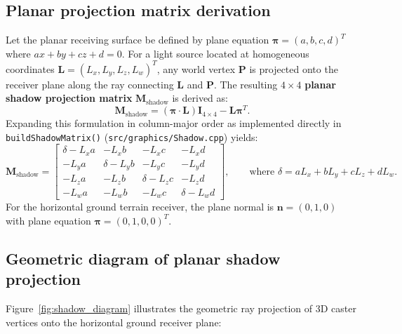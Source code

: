 \documentclass[10pt,a4paper,oneside]{article}
\begin{document}
\subsection{Planar projection matrix derivation}
Let the planar receiving surface be defined by plane equation $\boldsymbol\pi = (a, b, c, d)^T$ where $ax + by + cz + d = 0$. For a light source located at homogeneous coordinates $\mathbf{L} = (L_x, L_y, L_z, L_w)^T$, any world vertex $\mathbf{P}$ is projected onto the receiver plane along the ray connecting $\mathbf{L}$ and $\mathbf{P}$. The resulting $4 \times 4$ \textbf{planar shadow projection matrix} $\mathbf{M}_{\text{shadow}}$ is derived as:
\begin{equation}
\mathbf{M}_{\text{shadow}} = (\boldsymbol\pi \cdot \mathbf{L})\mathbf{I}_{4\times 4} - \mathbf{L} \boldsymbol\pi^T.
\end{equation}
Expanding this formulation in column-major order as implemented directly in \texttt{buildShadowMatrix()} (\texttt{src/graphics/Shadow.cpp}) yields:
\begin{equation}
\mathbf{M}_{\text{shadow}} = \begin{bmatrix}
\delta - L_x a & -L_x b & -L_x c & -L_x d \\
-L_y a & \delta - L_y b & -L_y c & -L_y d \\
-L_z a & -L_z b & \delta - L_z c & -L_z d \\
-L_w a & -L_w b & -L_w c & \delta - L_w d
\end{bmatrix}, \qquad \text{where } \delta = a L_x + b L_y + c L_z + d L_w.
\end{equation}
For the horizontal ground terrain receiver, the plane normal is $\mathbf{n} = (0, 1, 0)$ with plane equation $\boldsymbol\pi = (0, 1, 0, 0)^T$.

\subsection{Geometric diagram of planar shadow projection}
Figure~\ref{fig:shadow_diagram} illustrates the geometric ray projection of 3D caster vertices onto the horizontal ground receiver plane:
\end{document}
